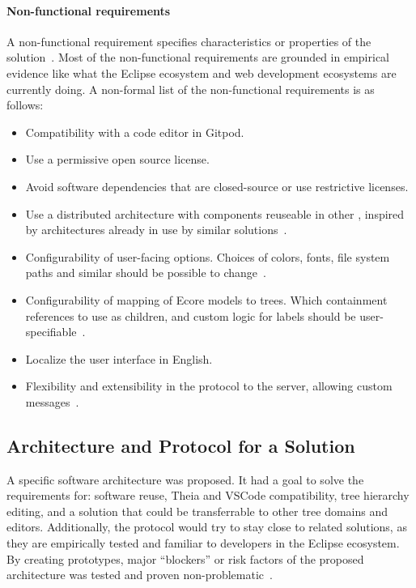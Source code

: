\paragraph{Non-functional requirements}
A non-functional requirement specifies characteristics or properties of the solution~\cite[p.~7]{wiegersSoftwareRequirements2013}.
Most of the non-functional requirements are grounded in empirical evidence like what the Eclipse ecosystem and web development ecosystems are currently doing.
A non-formal list of the non-functional requirements is as follows:

\begin{itemize}
  \item Compatibility with a code editor in \gls{Gitpod}.
  \item Use a permissive \gls{open source} license.
  \item Avoid software dependencies that are closed-source or use restrictive licenses.
  \item Use a distributed architecture with components reuseable in other , inspired by architectures already in use by similar solutions~\cite[p.~24]{rekstadModelingEnvironmentCloud2020}.
  \item Configurability of user-facing options. Choices of colors, fonts, file system paths and similar should be possible to change~\cite[p.~24]{rekstadModelingEnvironmentCloud2020}.
  \item Configurability of mapping of \gls{Ecore} models to trees. Which containment references to use as children, and custom logic for labels should be user-specifiable~\cite[p.~24]{rekstadModelingEnvironmentCloud2020}.
  \item Localize the user interface in English.
  \item Flexibility and extensibility in the protocol to the server, allowing custom messages~\cite[p.~24]{rekstadModelingEnvironmentCloud2020}.
\end{itemize}


\subsection{Architecture and Protocol for a Solution}\label{subsec:pre-project-protocol}

A specific software architecture was proposed.
It had a goal to solve the requirements for: software reuse, \gls{Theia} and \gls{VSCode} compatibility, tree hierarchy editing, and a solution that could be transferrable to other tree domains and editors.
Additionally, the protocol would try to stay close to related solutions, as they are empirically tested and familiar to developers in the Eclipse ecosystem.
By creating prototypes, major ``blockers'' or risk factors of the proposed architecture was tested and proven non-problematic~\cite[p.~38-46]{rekstadModelingEnvironmentCloud2020}.


